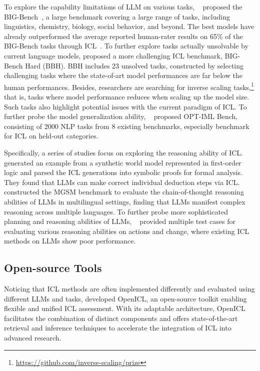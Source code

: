 To explore the capability limitations of LLM on various tasks, 
~\citet{beyond} proposed the BIG-Bench~\cite{beyond}, a large benchmark covering  
a large range of tasks, including linguistics, chemistry, biology, social behavior, and beyond. 
The best models have already outperformed the average reported human-rater results on 65\% of the BIG-Bench tasks through ICL~\cite{suzgun2022challenging}. To further explore tasks actually unsolvable by current language models, \citet{suzgun2022challenging} proposed a more challenging ICL benchmark, BIG-Bench Hard (BBH). BBH includes 23 unsolved tasks, constructed by selecting challenging tasks where the state-of-art model performances are far below the human performances. Besides, researchers are searching for inverse scaling tasks,\footnote{\url{https://github.com/inverse-scaling/prize}} that is, tasks where model performance reduces when scaling up the model size. Such tasks also highlight potential issues with the current paradigm of ICL.
To further probe the model generalization ability, ~\citet{optiml} proposed OPT-IML Bench, consisting of 2000 NLP tasks from 8 existing benchmarks, especially benchmark for ICL on held-out categories.

Specifically, a series of studies focus on exploring the reasoning ability of ICL.~\citet{heuristic} generated an example from a synthetic world model
represented in first-order logic and parsed the ICL generations into symbolic proofs for formal analysis. They found that LLMs can make correct individual deduction steps via ICL.
~\citet{shi2022language} constructed the MGSM benchmark to evaluate the chain-of-thought reasoning abilities of LLMs in multilingual settings, finding that LLMs manifest complex reasoning across multiple languages.
To further probe more sophisticated planning and reasoning abilities of LLMs, ~\citet{planbench} provided multiple test cases for evaluating various reasoning abilities on actions and change, where existing ICL methods on LLMs show poor performance.

\subsection{Open-source Tools}
Noticing that ICL methods are often implemented differently and evaluated using different LLMs and tasks, \citet{openicl} developed OpenICL, an open-source toolkit enabling flexible and unified ICL assessment. With its adaptable architecture, OpenICL facilitates the combination of distinct components and offers state-of-the-art retrieval and inference techniques to accelerate the integration of ICL into advanced research.


